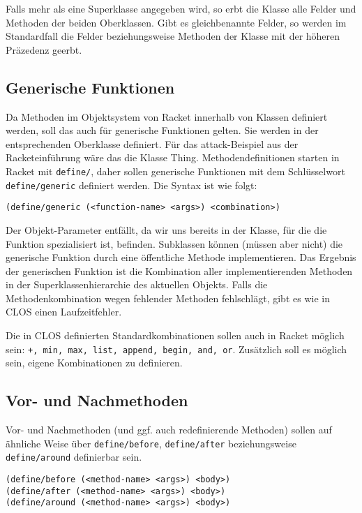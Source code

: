 Falls mehr als eine Superklasse angegeben wird, so erbt die Klasse alle Felder und Methoden der beiden Oberklassen. Gibt es gleichbenannte Felder, so werden im Standardfall die Felder beziehungsweise Methoden der Klasse mit der höheren Präzedenz geerbt.

\subsection{Generische Funktionen}
Da Methoden im Objektsystem von Racket innerhalb von Klassen definiert werden, soll das auch für generische Funktionen gelten. Sie werden in der entsprechenden Oberklasse definiert. Für das attack-Beispiel aus der Racketeinführung wäre das die Klasse Thing. Methodendefinitionen starten in Racket mit \texttt{define/}, daher sollen generische Funktionen mit dem Schlüsselwort \texttt{define/generic} definiert werden. Die Syntax ist wie folgt:

\texttt{(define/generic ({\textless}function-name{\textgreater} {\textless}args{\textgreater}) {\textless}combination{\textgreater})}

Der Objekt-Parameter entfällt, da wir uns bereits in der Klasse, für die die Funktion spezialisiert ist, befinden. Subklassen können (müssen aber nicht) die generische Funktion durch eine öffentliche Methode implementieren. Das Ergebnis der generischen Funktion ist die Kombination aller implementierenden Methoden in der Superklassenhierarchie des aktuellen Objekts. Falls die Methodenkombination wegen fehlender Methoden fehlschlägt, gibt es wie in CLOS einen Laufzeitfehler.

Die in CLOS definierten Standardkombinationen sollen auch in Racket möglich sein: \texttt{+, min, max, list, append, begin, and, or}. 
Zusätzlich soll es möglich sein, eigene Kombinationen zu definieren.


\subsection{Vor- und Nachmethoden}
Vor- und Nachmethoden (und ggf. auch redefinierende Methoden) sollen auf ähnliche Weise über \texttt{define/before}, \texttt{define/after} beziehungsweise \texttt{define/around} definierbar sein. 

\texttt{(define/before ({\textless}method-name{\textgreater} {\textless}args{\textgreater}) {\textless}body{\textgreater})}\\
\texttt{(define/after ({\textless}method-name{\textgreater} {\textless}args{\textgreater}) {\textless}body{\textgreater})}\\
\texttt{(define/around ({\textless}method-name{\textgreater} {\textless}args{\textgreater}) {\textless}body{\textgreater})}

